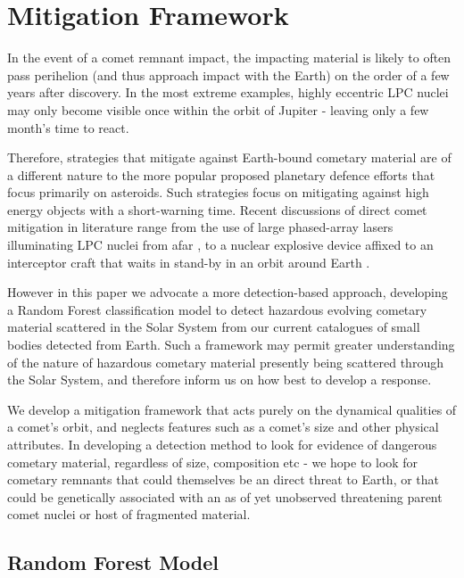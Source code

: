 \chapter{Mitigation Framework}
\label{chap:mitigation}

In the event of a comet remnant impact, the impacting material is likely to often pass perihelion (and thus approach impact with the Earth) on the order of a few years after discovery. In the most extreme examples, highly eccentric LPC nuclei may only become visible once within the orbit of Jupiter - leaving only a few month's time to react. 

Therefore, strategies that mitigate against Earth-bound cometary material are of a different nature to the more popular proposed planetary defence efforts that focus primarily on asteroids. Such strategies focus on mitigating against high energy objects with a short-warning time. Recent discussions of direct comet mitigation in literature range from the use of large phased-array lasers illuminating LPC nuclei from afar \citep{2016PASP..128d5001Z}, to a nuclear explosive device affixed to an interceptor craft that waits in stand-by in an orbit around Earth \citep{7500925, HUSSEIN2016488}. %

However in this paper we advocate a more detection-based approach, developing a Random Forest classification model to detect hazardous evolving cometary material scattered in the Solar System from our current catalogues of small bodies detected from Earth. Such a framework may permit greater understanding of the nature of hazardous cometary material presently being scattered through the Solar System, and therefore inform us on how best to develop a response.

We develop a mitigation framework that acts purely on the dynamical qualities of a comet's orbit, and neglects features such as a comet's size and other physical attributes. In developing a detection method to look for evidence of dangerous cometary material, regardless of size, composition etc - we hope to look for cometary remnants that could themselves be an direct threat to Earth, or that could be genetically associated with an as of yet unobserved threatening parent comet nuclei or host of fragmented material.

\section{Random Forest Model}

